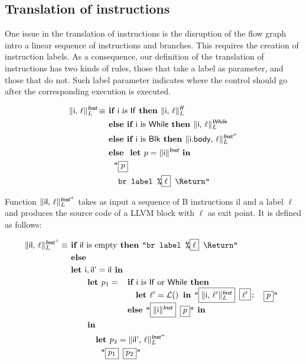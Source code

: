 \documentclass{llncs}
\newcommand{\trad}[2]{\ensuremath{\lVert \textsf{#1} \rVert^{\textit{#2}}}}
\newcommand{\nl}[0]{\text{\Return}}
\DeclareMathOperator{\isdef}{\equiv}
\DeclareMathOperator{\lbl}{\mathcal{L}()}
\newcommand{\llvm}[1]{\texttt{#1}}
\newcommand{\B}[1]{\textsf{#1}}
\newcommand{\ListOf}[1]{$\mbox{#1}^+$}
\newcommand{\IF}[0]{\textbf{ if }}
\newcommand{\ELSIF}[0]{\textbf{ else if }}
\newcommand{\ELSE}[0]{\textbf{ else }}
\newcommand{\THEN}[0]{\textbf{ then }}
\newcommand{\LET}[0]{\textbf{ let }}
\newcommand{\IN}[0]{\textbf{ in }}
\newcommand{\PH}[1]{\framebox{$#1$}}
\begin{document}
\subsection{Translation of instructions}
\label{sec:trad-instr}

One issue in the translation of instructions is the disruption of the flow graph
intro a linear sequence of instructions and branches. This requires the creation
of instruction labels. As a consequence, our definition of the translation of
instructions has two kinds of rules, those that take a label as parameter, and
those that do not. Such label parameter indicates where the control should go
after the corresponding execution is executed.

\begin{align*}
\trad{\B{i}, $\ell$}{\B{Inst}}_L \isdef
& \IF \B{i} \mbox{ is \B{If}} \THEN \trad{\B{i}, $\ell$}{\B{If}}_L \\
& \ELSIF \B{i} \mbox{ is \B{While}} \THEN \trad{\B{i}, $\ell$}{\B{While}}_L \\
& \ELSIF \B{i} \mbox{ is \B{Blk}} \THEN \trad{\B{i.body}, $\ell$}{\ListOf{\B{Inst}}}_L \\
& \ELSE \LET p = \trad{\B{i}}{\B{Inst}} \IN \\
& \quad \llvm{"\PH{p}} \\
& \quad \llvm{ br label \%\PH{\ell} \nl"}
\end{align*}

Function $\trad{\B{il}, $\ell$}{\ListOf{\B{Inst}}}_L$ takes as input a sequence
of B instructions \B{il} and a label $\ell$ and produces the source code of a
LLVM block with $\ell$ as exit point. It is defined as follows: 

\begin{align*}
\trad{\B{il}, $\ell$}{\ListOf{\B{Inst}}}_L \isdef & \IF \B{il} \mbox{ is empty} \THEN \llvm{"br label \%\PH{\ell} \nl"} \\
& \ELSE \\
& \LET \B{i}, \B{il'} = \B{il}  \IN \\
& \quad \quad \LET p_1 = 
\begin{array}[t]{l}
  \IF \B{i} \mbox{ is \B{If} or \B{While}} \THEN \\
  \quad \LET \ell' = \lbl \IN \llvm{"\PH{\trad{i, $\ell'$}{\B{Inst}}_L} \PH{\ell'}: \PH{p}"} \\
  \ELSE \llvm{"\PH{\trad{i}{\B{Inst}}} \PH{p}"} \IN
\end{array} \\
& \quad \quad \IN \\
& \quad \quad \quad \LET p_2 = \trad{il', $\ell$}{\ListOf{\B{Inst}}}_L \\
& \quad \quad \quad \quad \llvm{"\PH{p_1} \PH{p_2}"}
\end{align*}
\end{document}
